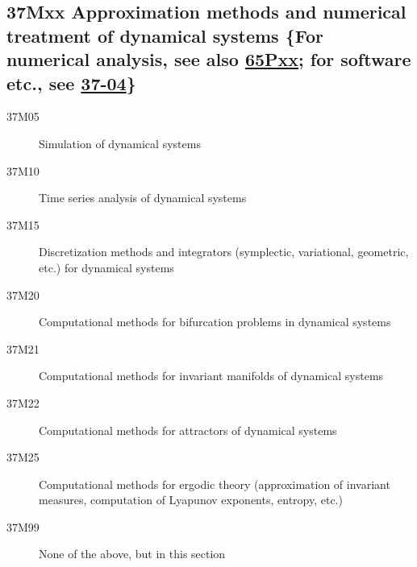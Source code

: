 \documentclass[letterpaper]{article}
\begin{document}
\subsection*{37Mxx  Approximation methods and numerical treatment of dynamical systems \{For numerical analysis, see also \hyperref[65Pxx]{65Pxx}; for software etc., see \hyperref[37-04]{37-04}\} }\label{37Mxx}
\begin{description}  
\item [37M05]\label{37M05} Simulation of dynamical systems
\item [37M10]\label{37M10} Time series analysis of dynamical systems
\item [37M15]\label{37M15} Discretization methods and integrators (symplectic, variational, geometric, etc.)  for dynamical systems
\item [37M20]\label{37M20} Computational methods for bifurcation problems in dynamical systems
\item [37M21]\label{37M21} Computational methods for invariant manifolds of dynamical systems
\item [37M22]\label{37M22} Computational methods for attractors of dynamical systems
\item [37M25]\label{37M25} Computational methods for ergodic theory (approximation of invariant measures, computation of Lyapunov exponents, entropy, etc.) 
\item [37M99]\label{37M99} None of the above, but in this section
\end{description}
\end{document}
